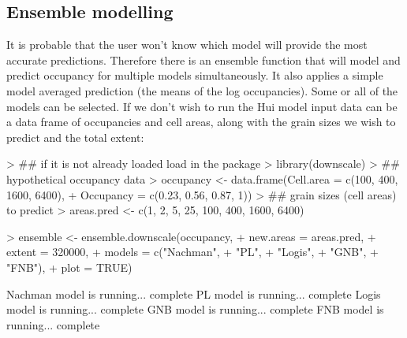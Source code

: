 \documentclass{article}[12pt, a4paper]
\begin{document}
\subsection{Ensemble modelling}
It is probable that the user won’t know which model will provide the most accurate predictions. Therefore there is an ensemble function that will model and predict occupancy for multiple models simultaneously. It also applies a simple model averaged prediction (the means of the log occupancies). Some or all of the models can be selected. If we don’t wish to run the Hui model input data can be a data frame of occupancies and cell areas, along with the grain sizes we wish to predict and the total extent:

\begin{Schunk}
\begin{Sinput}
> ## if it is not already loaded load in the package
> library(downscale)
> ## hypothetical occupancy data
> occupancy <- data.frame(Cell.area = c(100, 400, 1600, 6400),
+                         Occupancy = c(0.23, 0.56, 0.87, 1))
> ## grain sizes (cell areas) to predict
> areas.pred <- c(1, 2, 5, 25, 100, 400, 1600, 6400)
\end{Sinput}
\end{Schunk}
\begin{Schunk}
\begin{Sinput}
> ensemble <- ensemble.downscale(occupancy,
+                                new.areas = areas.pred,
+                                extent = 320000,
+                                models = c("Nachman",
+                                           "PL",
+                                           "Logis",
+                                           "GNB",
+                                           "FNB"),
+                                plot = TRUE)
\end{Sinput}
\begin{Soutput}
Nachman model is running...  complete 
PL model is running...  complete 
Logis model is running...  complete 
GNB model is running...  complete 
FNB model is running...  complete 

\end{Soutput}
\end{Schunk}
\end{document}

